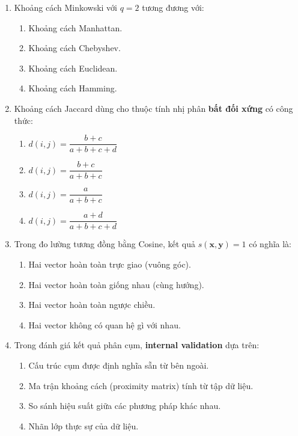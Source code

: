 \documentclass[10pt]{article}
\begin{document}
\begin{enumerate}[leftmargin=*, label=\textbf{Câu \arabic*.}]
    \item Khoảng cách Minkowski với $q=2$ tương đương với:
    \begin{enumerate}[label=\Alph*.]
        \item Khoảng cách Manhattan.
        \item Khoảng cách Chebyshev.
        \item Khoảng cách Euclidean.
        \item Khoảng cách Hamming.
    \end{enumerate}

    \item Khoảng cách Jaccard dùng cho thuộc tính nhị phân \textbf{bất đối xứng} có công thức:
    \begin{enumerate}[label=\Alph*.]
        \item $d(i,j) = \dfrac{b+c}{a+b+c+d}$
        \item $d(i,j) = \dfrac{b+c}{a+b+c}$
        \item $d(i,j) = \dfrac{a}{a+b+c}$
        \item $d(i,j) = \dfrac{a+d}{a+b+c+d}$
    \end{enumerate}

    \item Trong đo lường tương đồng bằng Cosine, kết quả $s(\mathbf{x}, \mathbf{y}) = 1$ có nghĩa là:
    \begin{enumerate}[label=\Alph*.]
        \item Hai vector hoàn toàn trực giao (vuông góc).
        \item Hai vector hoàn toàn giống nhau (cùng hướng).
        \item Hai vector hoàn toàn ngược chiều.
        \item Hai vector không có quan hệ gì với nhau.
    \end{enumerate}

    \item Trong đánh giá kết quả phân cụm, \textbf{internal validation} dựa trên:
    \begin{enumerate}[label=\Alph*.]
        \item Cấu trúc cụm được định nghĩa sẵn từ bên ngoài.
        \item Ma trận khoảng cách (proximity matrix) tính từ tập dữ liệu.
        \item So sánh hiệu suất giữa các phương pháp khác nhau.
        \item Nhãn lớp thực sự của dữ liệu.
    \end{enumerate}


\end{enumerate}
\end{document}
